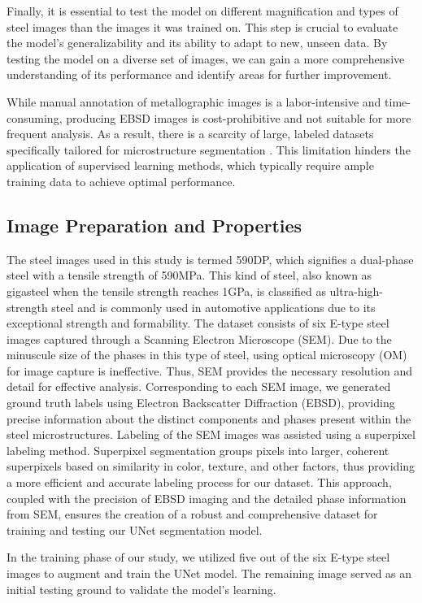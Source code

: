 \documentclass[]{article}
\begin{document}
Finally, it is essential to test the model on different magnification and types of steel images than the images it was trained on. This step is crucial to evaluate the model's generalizability and its ability to adapt to new, unseen data. By testing the model on a diverse set of images, we can gain a more comprehensive understanding of its performance and identify areas for further improvement.

While manual annotation of metallographic images is a labor-intensive and time-consuming, producing EBSD images is cost-prohibitive and not suitable for more frequent analysis. As a result, there is a scarcity of large, labeled datasets specifically tailored for microstructure segmentation \cite{Roberts2019}. This limitation hinders the application of supervised learning methods, which typically require ample training data to achieve optimal performance.

\subsection{Image Preparation and Properties}
The steel images used in this study is termed 590DP, which signifies a dual-phase steel with a tensile strength of 590MPa. This kind of steel, also known as gigasteel when the tensile strength reaches 1GPa, is classified as ultra-high-strength steel and is commonly used in automotive applications due to its exceptional strength and formability.
The dataset consists of six E-type steel images captured through a Scanning Electron Microscope (SEM). Due to the minuscule size of the phases in this type of steel, using optical microscopy (OM) for image capture is ineffective. Thus, SEM provides the necessary resolution and detail for effective analysis. Corresponding to each SEM image, we generated ground truth labels using Electron Backscatter Diffraction (EBSD), providing precise information about the distinct components and phases present within the steel microstructures.
Labeling of the SEM images was assisted using a superpixel labeling method. Superpixel segmentation groups pixels into larger, coherent superpixels based on similarity in color, texture, and other factors, thus providing a more efficient and accurate labeling process for our dataset. This approach, coupled with the precision of EBSD imaging and the detailed phase information from SEM, ensures the creation of a robust and comprehensive dataset for training and testing our UNet segmentation model.

In the training phase of our study, we utilized five out of the six E-type steel images to augment and train the UNet model. The remaining image served as an initial testing ground to validate the model's learning.
\end{document}

